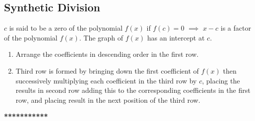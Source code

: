 \subsection{Synthetic Division}

$c$ is said to be a zero of the polynomial $f(x)$ if $f(c) = 0$ $\implies$ $x-c$ is a factor of the polynomial $f(x)$. The graph of $f(x)$ has an intercept at $c$.

\begin{enumerate}
\item Arrange the coefficients in descending order in the first row.

\item Third row is formed by bringing down the first coefficient of $f(x)$ then successively multiplying each coefficient in the third row by $c$, placing the results in second row adding this to the corresponding coefficients in the first row, and placing result in the next position of the third row.
\end{enumerate}

\vspace{5mm}
\begin{center}
\textbf{***********}
\end{center}
 